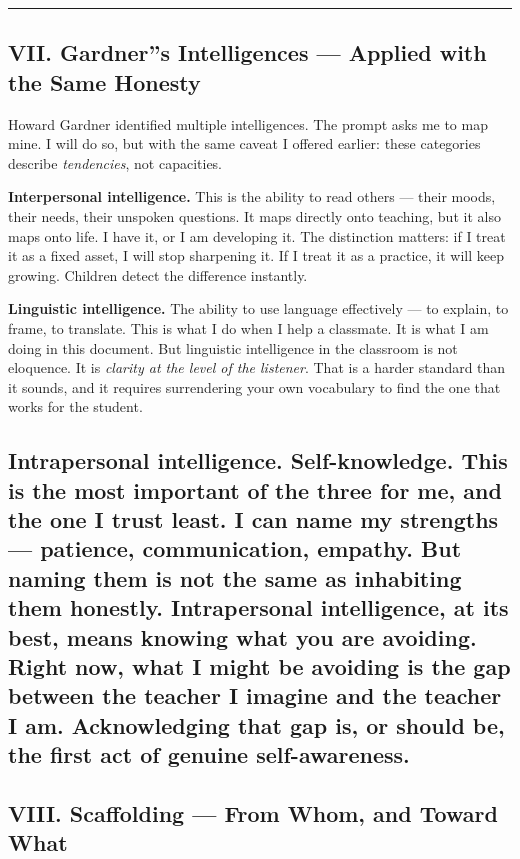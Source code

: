 \documentclass[12pt,a4paper]{article}
\begin{document}
\begin{center}
\rule{0.5\textwidth}{0.4pt}
\end{center}

\subsection{VII. Gardner''s Intelligences --- Applied with the Same Honesty}

Howard Gardner identified multiple intelligences. The prompt asks me to map mine. I will do so, but with the same caveat I offered earlier: these categories describe \emph{tendencies}, not capacities.

\textbf{Interpersonal intelligence.} This is the ability to read others --- their moods, their needs, their unspoken questions. It maps directly onto teaching, but it also maps onto life. I have it, or I am developing it. The distinction matters: if I treat it as a fixed asset, I will stop sharpening it. If I treat it as a practice, it will keep growing. Children detect the difference instantly.

\textbf{Linguistic intelligence.} The ability to use language effectively --- to explain, to frame, to translate. This is what I do when I help a classmate. It is what I am doing in this document. But linguistic intelligence in the classroom is not eloquence. It is \emph{clarity at the level of the listener}. That is a harder standard than it sounds, and it requires surrendering your own vocabulary to find the one that works for the student.

\subsection{\textbf{Intrapersonal intelligence.} Self-knowledge. This is the most important of the three for me, and the one I trust least. I can name my strengths --- patience, communication, empathy. But naming them is not the same as inhabiting them honestly. Intrapersonal intelligence, at its best, means knowing what you are avoiding. Right now, what I might be avoiding is the gap between the teacher I imagine and the teacher I am. Acknowledging that gap is, or should be, the first act of genuine self-awareness.}

\subsection{VIII. Scaffolding --- From Whom, and Toward What}
\end{document}
